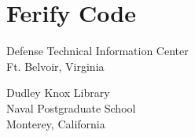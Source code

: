 \documentclass[twoside,thesis]{npsreport}
\begin{document}
\chapter{Ferify Code}



%


%
%
\NPSend

%
\begin{distributionlist}
\item Defense Technical Information Center\\Ft. Belvoir, Virginia
\item Dudley Knox Library\\Naval Postgraduate School\\Monterey, California
%
%
%
\end{distributionlist}
\end{document}
